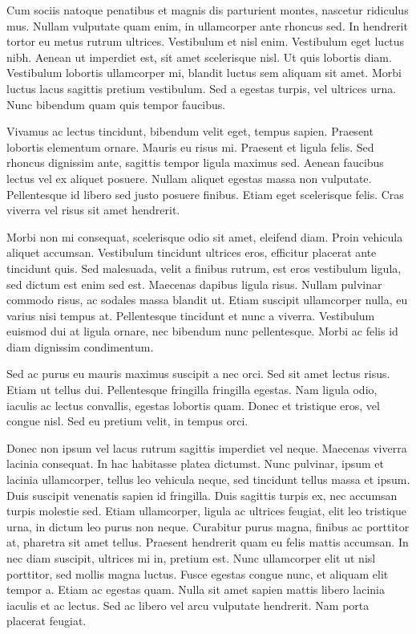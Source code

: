 \documentclass[landscape]{book}
\begin{document}
Cum sociis natoque penatibus et magnis dis parturient montes, nascetur ridiculus mus. Nullam vulputate quam enim, in ullamcorper ante rhoncus sed. In hendrerit tortor eu metus rutrum ultrices. Vestibulum et nisl enim. Vestibulum eget luctus nibh. Aenean ut imperdiet est, sit amet scelerisque nisl. Ut quis lobortis diam. Vestibulum lobortis ullamcorper mi, blandit luctus sem aliquam sit amet. Morbi luctus lacus sagittis pretium vestibulum. Sed a egestas turpis, vel ultrices urna. Nunc bibendum quam quis tempor faucibus.

Vivamus ac lectus tincidunt, bibendum velit eget, tempus sapien. Praesent lobortis elementum ornare. Mauris eu risus mi. Praesent et ligula felis. Sed rhoncus dignissim ante, sagittis tempor ligula maximus sed. Aenean faucibus lectus vel ex aliquet posuere. Nullam aliquet egestas massa non vulputate. Pellentesque id libero sed justo posuere finibus. Etiam eget scelerisque felis. Cras viverra vel risus sit amet hendrerit.

Morbi non mi consequat, scelerisque odio sit amet, eleifend diam. Proin vehicula aliquet accumsan. Vestibulum tincidunt ultrices eros, efficitur placerat ante tincidunt quis. Sed malesuada, velit a finibus rutrum, est eros vestibulum ligula, sed dictum est enim sed est. Maecenas dapibus ligula risus. Nullam pulvinar commodo risus, ac sodales massa blandit ut. Etiam suscipit ullamcorper nulla, eu varius nisi tempus at. Pellentesque tincidunt et nunc a viverra. Vestibulum euismod dui at ligula ornare, nec bibendum nunc pellentesque. Morbi ac felis id diam dignissim condimentum.

Sed ac purus eu mauris maximus suscipit a nec orci. Sed sit amet lectus risus. Etiam ut tellus dui. Pellentesque fringilla fringilla egestas. Nam ligula odio, iaculis ac lectus convallis, egestas lobortis quam. Donec et tristique eros, vel congue nisl. Sed eu pretium velit, in tempus orci.

Donec non ipsum vel lacus rutrum sagittis imperdiet vel neque. Maecenas viverra lacinia consequat. In hac habitasse platea dictumst. Nunc pulvinar, ipsum et lacinia ullamcorper, tellus leo vehicula neque, sed tincidunt tellus massa et ipsum. Duis suscipit venenatis sapien id fringilla. Duis sagittis turpis ex, nec accumsan turpis molestie sed. Etiam ullamcorper, ligula ac ultrices feugiat, elit leo tristique urna, in dictum leo purus non neque. Curabitur purus magna, finibus ac porttitor at, pharetra sit amet tellus. Praesent hendrerit quam eu felis mattis accumsan. In nec diam suscipit, ultrices mi in, pretium est. Nunc ullamcorper elit ut nisl porttitor, sed mollis magna luctus. Fusce egestas congue nunc, et aliquam elit tempor a. Etiam ac egestas quam. Nulla sit amet sapien mattis libero lacinia iaculis et ac lectus. Sed ac libero vel arcu vulputate hendrerit. Nam porta placerat feugiat.
\end{document}

